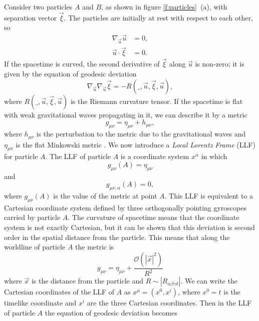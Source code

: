 Consider two particles $A$ and $B$, as shown in figure \ref{f:particles}~(a),
with separation vector $\vec{\xi}$. The particles are initially at rest with
respect to each other, so
\begin{align}
\nabla_{\vec{u}} \vec{u} &= 0, \\
\vec{u} \cdot \vec{\xi} & = 0.
\end{align}
If the spacetime is curved, the second derivative of $\vec{\xi}$ along
$\vec{u}$ is non-zero; it is given by the equation of geodesic deviation
\begin{equation}
\nabla_{\vec{u}}\nabla_{\vec{u}} \vec{\xi} = -
R(\_,\vec{u},\vec{\xi},\vec{u}),
\end{equation}
where $R(\_,\vec{u},\vec{\xi},\vec{u})$ is the Riemann curvature tensor. 
If the spacetime is flat with weak gravitational waves propagating in it, we
can describe it by a metric 
\begin{equation}
g_{\mu\nu} = \eta_{\mu\nu} + h_{\mu\nu},
\end{equation}
where $h_{\mu\nu}$ is the perturbation to the metric due to the gravitational
waves and $\eta_{\mu\nu}$ is the flat Minkowski metric .  We now introduce a
\emph{Local Lorentz Frame} (LLF) for particle $A$.  The LLF of particle $A$ is
a coordinate system $x^\alpha$ in which
\begin{equation}
g_{\mu\nu}(A) = \eta_{\mu\nu}
\end{equation}
and
\begin{equation}
g_{\mu\nu,\alpha}(A) = 0,
\end{equation}
where $g_{\mu\nu}(A)$ is the value of the metric at point $A$. This LLF
is equivalent to a Cartesian coordinate system defined by three orthogonally
pointing gyroscopes carried by particle $A$. The curvature of spacetime means
that the coordinate system is not exactly Cartesian, but it can be shown that
this deviation is second order in the spatial distance from the
particle\cite{MTW73}. This means that along the worldline of particle $A$ the
metric is
\begin{equation}
g_{\mu\nu} = \eta_{\mu\nu} + \frac{\mathcal{O}\left(|\vec{x}|^2\right)}{R^2}
\end{equation}
where $\vec{x}$ is the distance from the particle and $R \sim
|R_{\alpha\beta\gamma\delta}|$. We can write the Cartesian coordinates of the
LLF of $A$ as $x^\mu = (x^0,x^i)$, where $x^0 = t$ is the timelike coordinate
and $x^i$ are the three Cartesian coordinates. Then in
the LLF of particle $A$ the equation of geodesic deviation becomes
